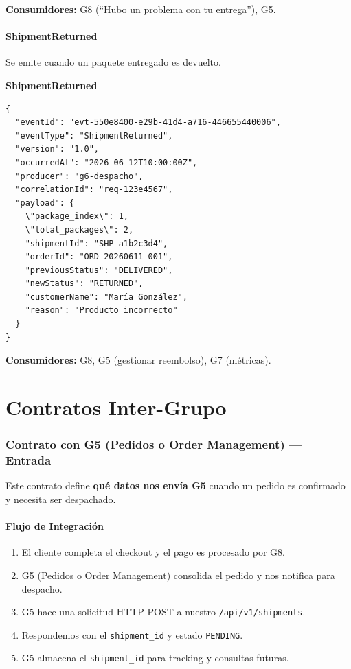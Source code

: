 \documentclass[11pt, a4paper]{article}
\newcommand{\contractheader}[1]{%
  \noindent\colorbox{primary!10}{%
    \parbox{\dimexpr\textwidth-2\fboxsep}{%
      \textbf{\faFileCode\quad #1}%
    }%
  }
  \vspace{0.3cm}
}
\begin{document}
\textbf{Consumidores:} G8 (``Hubo un problema con tu entrega''), G5.

\vspace{0.4cm}

\subsection{ShipmentReturned}

Se emite cuando un paquete entregado es devuelto.

\contractheader{ShipmentReturned}

\begin{lstlisting}
{
  "eventId": "evt-550e8400-e29b-41d4-a716-446655440006",
  "eventType": "ShipmentReturned",
  "version": "1.0",
  "occurredAt": "2026-06-12T10:00:00Z",
  "producer": "g6-despacho",
  "correlationId": "req-123e4567",
  "payload": {
    \"package_index\": 1,
    \"total_packages\": 2,
    "shipmentId": "SHP-a1b2c3d4",
    "orderId": "ORD-20260611-001",
    "previousStatus": "DELIVERED",
    "newStatus": "RETURNED",
    "customerName": "María González",
    "reason": "Producto incorrecto"
  }
}
\end{lstlisting}

\textbf{Consumidores:} G8, G5 (gestionar reembolso), G7 (métricas).


\newpage
\part{Contratos Inter-Grupo}

\section{Contrato con G5 (Pedidos o Order Management) --- Entrada}
\label{sec:contrato-g5}

Este contrato define \textbf{qué datos nos envía G5} cuando un pedido es
confirmado y necesita ser despachado.

\subsection{Flujo de Integración}

\begin{enumerate}[noitemsep]
  \item El cliente completa el checkout y el pago es procesado por G8.
  \item G5 (Pedidos o Order Management) consolida el pedido y nos notifica para despacho.
  \item G5 hace una solicitud HTTP POST a nuestro \texttt{/api/v1/shipments}.
  \item Respondemos con el \texttt{shipment\_id} y estado \texttt{PENDING}.
  \item G5 almacena el \texttt{shipment\_id} para tracking y consultas futuras.
\end{enumerate}
\end{document}
